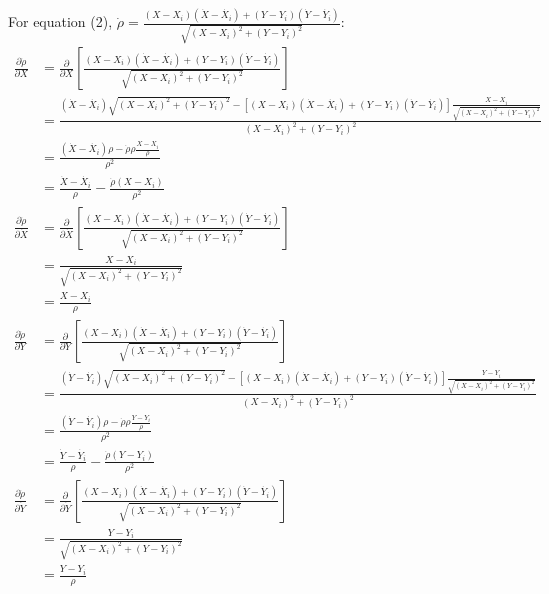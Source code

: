 \documentclass{article}
\begin{document}
For equation (2), $\dot{\rho} = \frac{(X-X_i)(\dot{X}-\dot{X_i})+(Y-Y_i)(\dot{Y}-\dot{Y_i})}{\sqrt{(X-X_i)^2 + (Y-Y_i)^2}}$:
\begin{align*}
    \frac{\partial \dot{\rho}}{\partial X} &= \frac{\partial}{\partial X} \left[\frac{(X-X_i)(\dot{X}-\dot{X_i})+(Y-Y_i)(\dot{Y}-\dot{Y_i})}{\sqrt{(X-X_i)^2 + (Y-Y_i)^2}}\right] \\
    &= \frac{(\dot{X}-\dot{X_i})\sqrt{(X-X_i)^2 + (Y-Y_i)^2} - [(X-X_i)(\dot{X}-\dot{X_i})+(Y-Y_i)(\dot{Y}-\dot{Y_i})]\frac{X-X_i}{\sqrt{(X-X_i)^2 + (Y-Y_i)^2}}}{(X-X_i)^2 + (Y-Y_i)^2} \\
    &= \frac{(\dot{X}-\dot{X_i})\rho - \dot{\rho}\rho\frac{X-X_i}{\rho}}{\rho^2} \\
    &= \frac{\dot{X}-\dot{X_i}}{\rho} - \frac{\dot{\rho}(X-X_i)}{\rho^2} \\[10pt]
    \frac{\partial \dot{\rho}}{\partial \dot{X}} &= \frac{\partial}{\partial \dot{X}} \left[\frac{(X-X_i)(\dot{X}-\dot{X_i})+(Y-Y_i)(\dot{Y}-\dot{Y_i})}{\sqrt{(X-X_i)^2 + (Y-Y_i)^2}}\right] \\
    &= \frac{X-X_i}{\sqrt{(X-X_i)^2 + (Y-Y_i)^2}} \\
    &= \frac{X-X_i}{\rho} \\[10pt]
    \frac{\partial \dot{\rho}}{\partial Y} &= \frac{\partial}{\partial Y} \left[\frac{(X-X_i)(\dot{X}-\dot{X_i})+(Y-Y_i)(\dot{Y}-\dot{Y_i})}{\sqrt{(X-X_i)^2 + (Y-Y_i)^2}}\right] \\
    &= \frac{(\dot{Y}-\dot{Y_i})\sqrt{(X-X_i)^2 + (Y-Y_i)^2} - [(X-X_i)(\dot{X}-\dot{X_i})+(Y-Y_i)(\dot{Y}-\dot{Y_i})]\frac{Y-Y_i}{\sqrt{(X-X_i)^2 + (Y-Y_i)^2}}}{(X-X_i)^2 + (Y-Y_i)^2} \\
    &= \frac{(\dot{Y}-\dot{Y_i})\rho - \dot{\rho}\rho\frac{Y-Y_i}{\rho}}{\rho^2} \\
    &= \frac{\dot{Y}-\dot{Y_i}}{\rho} - \frac{\dot{\rho}(Y-Y_i)}{\rho^2} \\[10pt]
    \frac{\partial \dot{\rho}}{\partial \dot{Y}} &= \frac{\partial}{\partial \dot{Y}} \left[\frac{(X-X_i)(\dot{X}-\dot{X_i})+(Y-Y_i)(\dot{Y}-\dot{Y_i})}{\sqrt{(X-X_i)^2 + (Y-Y_i)^2}}\right] \\
    &= \frac{Y-Y_i}{\sqrt{(X-X_i)^2 + (Y-Y_i)^2}} \\
    &= \frac{Y-Y_i}{\rho}
\end{align*}
\end{document}

